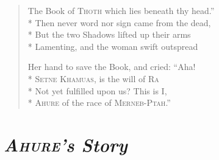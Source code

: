\documentclass[12pt]{article}
\newcommand{\vin}{\hspace{1em}}
\begin{document}
\begin{verse}
The Book of \textsc{Thoth} which lies beneath thy head.''\\*
Then never word nor sign came from the dead,\\*
\vin But the two Shadows lifted up their arms\\*
Lamenting, and the woman swift outspread

Her hand to save the Book, and cried: ``Aha!\\*
\textsc{Setne Khamuas}, is the will of \textsc{Ra}\\*
\vin Not yet fulfilled upon us? This is I,\\*
\textsc{Ahure} of the race of \textsc{Merneb-Ptah}.''
\end{verse}


\section*{\mdseries\itshape \textsc{Ahure}'s Story}
\end{document}
